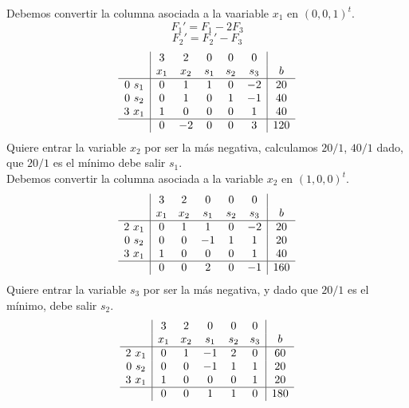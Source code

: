 \documentclass[11pt,fleqn]{book} %
\begin{document}
Debemos convertir la columna asociada a la vaariable $x_1$ en $(0, 0, 1)^t$.
$$F_1'=F_1-2F_3$$
$$F_2'=F_2'-F_3$$
$$
\begin{array}{c|ccccc|c}
& 3 & 2 & 0 & 0 & 0 & \\
& x_1 & x_2 & s_1 & s_2 & s_3 & b \\ \hline
0 ~s_1 & 0 & 1 & 1 & 0 &-2 & 20 \\
0~ s_2 & 0 & 1 & 0 & 1 & -1 & 40 \\
3 ~x_1 & 1 & 0 & 0 & 0 & 1 & 40 \\ \hline 
& 0 & -2 & 0 & 0 & 3 & 120
\end{array}
$$
Quiere entrar la variable $x_2$ por ser la más negativa, calculamos $20/1$, $40/1$ dado, que $20/1$ es el mínimo debe salir $s_1$. \\
Debemos convertir la columna asociada a la variable $x_2$ en $(1, 0, 0)^t$.
$$
\begin{array}{c|ccccc|c}
& 3 & 2 & 0 & 0 & 0 & \\
& x_1 & x_2 & s_1 & s_2 & s_3 & b \\ \hline
2 ~x_1 & 0 & 1 & 1 & 0 &-2 & 20 \\
0~ s_2 & 0 & 0 & -1 & 1 & 1 & 20 \\
3 ~x_1 & 1 & 0 & 0 & 0 & 1 & 40 \\ \hline 
& 0 & 0 & 2 & 0 & -1 & 160
\end{array}
$$
Quiere entrar la variable $s_3$ por ser la más negativa,  y dado que $20/1$ es el mínimo, debe salir $s_2$.
$$
\begin{array}{c|ccccc|c}
& 3 & 2 & 0 & 0 & 0 & \\
& x_1 & x_2 & s_1 & s_2 & s_3 & b \\ \hline
2 ~x_1 & 0 & 1 & -1 & 2 & 0 & 60 \\
0~ s_2 & 0 & 0 & -1 & 1 & 1 & 20 \\
3 ~x_1 & 1 & 0 & 0 & 0 & 1 & 20 \\ \hline 
& 0 & 0 & 1 & 1 & 0 & 180
\end{array}
$$
\end{document}
